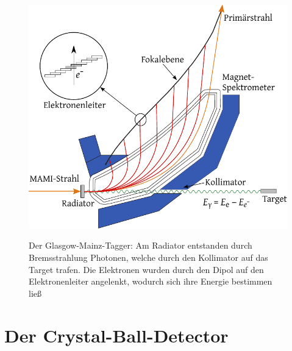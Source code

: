 \documentclass[a4paper,11pt,oneside,final,german,openbib,pdftex]{scrbook}
\begin{document}
\begin{figure}[h]
	\begin{center}
	\includegraphics{TAGGER}
	\label{fig.TAGGER}
	\caption{Der Glasgow-Mainz-Tagger: Am Radiator entstanden durch Bremsstrahlung Photonen, welche durch den Kollimator auf das Target trafen. Die Elektronen wurden durch den Dipol auf den Elektronenleiter angelenkt, wodurch sich ihre Energie bestimmen lie{\ss}\cite{Un08}}
	\end{center}
\end{figure}
 
 
\section{Der Crystal-Ball-Detector}
\end{document}
